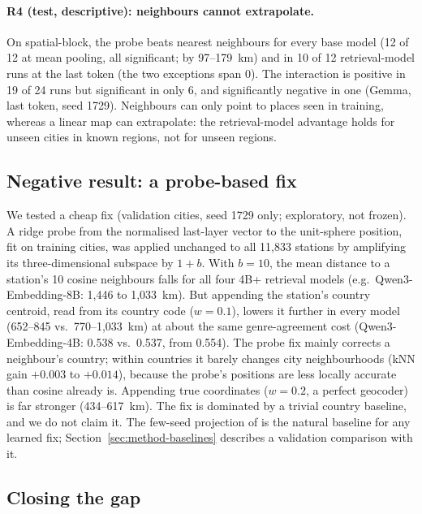 \paragraph{R4 (test, descriptive): neighbours cannot extrapolate.}
On spatial-block, the probe beats nearest neighbours for every base model (12 of 12 at mean pooling, all significant; by 97--179~km) and in 10 of 12 retrieval-model runs at the last token (the two exceptions span 0). The interaction is positive in 19 of 24 runs but significant in only 6, and significantly negative in one (Gemma, last token, seed 1729). Neighbours can only point to places seen in training, whereas a linear map can extrapolate: the retrieval-model advantage holds for unseen cities in known regions, not for unseen regions.

\subsection{Negative result: a probe-based fix}
\label{sec:res-fix}

We tested a cheap fix (validation cities, seed 1729 only; exploratory, not frozen). A ridge probe from the normalised last-layer vector to the unit-sphere position, fit on training cities, was applied unchanged to all 11,833 stations by amplifying its three-dimensional subspace by $1+b$. With $b=10$, the mean distance to a station's 10 cosine neighbours falls for all four 4B+ retrieval models (e.g.\ Qwen3-Embedding-8B: 1,446 to 1,033~km). But appending the station's country centroid, read from its country code ($w=0.1$), lowers it further in every model (652--845 vs.\ 770--1,033~km) at about the same genre-agreement cost (Qwen3-Embedding-4B: 0.538 vs.\ 0.537, from 0.554). The probe fix mainly corrects a neighbour's country; within countries it barely changes city neighbourhoods (kNN gain $+0.003$ to $+0.014$), because the probe's positions are less locally accurate than cosine already is. Appending true coordinates ($w=0.2$, a perfect geocoder) is far stronger (434--617~km). The fix is dominated by a trivial country baseline, and we do not claim it. The few-seed projection of \citet{feuerstein2026recovering} is the natural baseline for any learned fix; Section~\ref{sec:method-baselines} describes a validation comparison with it.

\subsection{Closing the gap}
\label{sec:res-closing}

